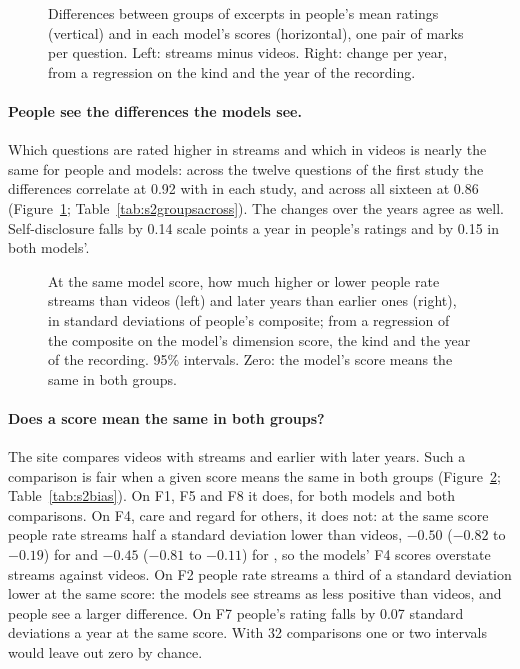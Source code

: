 \begin{figure}[!htb]\centering

\caption{Differences between groups of excerpts in people's mean ratings (vertical) and in each model's scores
(horizontal), one pair of marks per question. Left: streams minus videos. Right: change per year, from a
regression on the kind and the year of the recording.}\label{fig:s2groups}
\end{figure}

\paragraph{People see the differences the models see.} Which questions are rated higher in streams and which in
videos is nearly the same for people and models: across the twelve questions of the first study the differences
correlate at 0.92 with \jev{} in each study, and across all sixteen at 0.86 (Figure~\ref{fig:s2groups};
Table~\ref{tab:s2groupsacross}). The changes over the years agree as well. Self-disclosure falls by 0.14 scale
points a year in people's ratings and by 0.15 in both models'.

\begin{figure}[!htb]\centering

\caption{At the same model score, how much higher or lower people rate streams than videos (left) and later
years than earlier ones (right), in standard deviations of people's composite; from a regression of the
composite on the model's dimension score, the kind and the year of the recording. 95\% intervals. Zero: the
model's score means the same in both groups.}\label{fig:s2bias}
\end{figure}

\paragraph{Does a score mean the same in both groups?} The site compares videos with streams and earlier with
later years. Such a comparison is fair when a given score means the same in both groups
(Figure~\ref{fig:s2bias}; Table~\ref{tab:s2bias}). On F1, F5 and F8 it does, for both models and both
comparisons. On F4, care and regard for others, it does not: at the same score people rate streams half a
standard deviation lower than videos, $-0.50$ ($-0.82$ to $-0.19$) for \jev{} and $-0.45$ ($-0.81$ to $-0.11$)
for \drex{}, so the models' F4 scores overstate streams against videos. On F2 people rate streams a third of a
standard deviation lower at the same score: the models see streams as less positive than videos, and people see
a larger difference. On F7 people's rating falls by 0.07 standard deviations a year at the same score. With 32
comparisons one or two intervals would leave out zero by chance.

